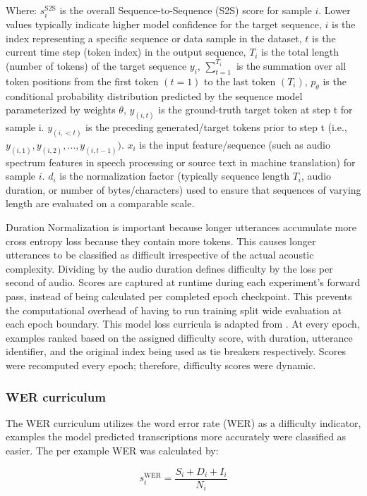 {Where:
 $s_i^ \text{S2S}$ is the overall Sequence-to-Sequence (S2S) score for sample $i$. Lower values typically indicate higher model confidence for the target sequence,
 $i$ is the index representing a specific sequence or data sample in the dataset,
$t$ is the current time step (token index) in the output sequence,
$T_i$ is the total length (number of tokens) of the target sequence $y_i$,
$\sum_{t=1}^{T_i}$ is the summation over all token positions from the first token $(t=1)$ to the last token $(T_i)$,
$p_\theta$ is the conditional probability distribution predicted by the sequence model parameterized by weights $θ$,
$y_(i,t)$ is the ground-truth target token at step t for sample i.
$y_(i,<t)$ is the preceding generated/target tokens prior to step t (i.e., $y_(i,1),y_(i,2),…,y_(i,t-1))$.
$x_i$ is the input feature/sequence (such as audio spectrum features in speech processing or source text in machine translation) for sample $i$.
$d_i$ is the normalization factor (typically sequence length $T_i$, audio duration, or number of bytes/characters) used to ensure that sequences of varying length are evaluated on a comparable scale.

Duration Normalization is important because longer utterances accumulate more cross entropy loss because they contain more tokens. This causes longer utterances to be classified as difficult irrespective of the actual acoustic complexity. Dividing by the audio duration defines difficulty by the loss per second of audio.
Scores are captured at runtime during each experiment’s forward pass, instead of being calculated per completed epoch checkpoint. This prevents the computational overhead of having to run training split wide evaluation at each epoch boundary. This model loss curricula is adapted from \citep{Karakasidis1382}. At every epoch, examples ranked based on the assigned difficulty score, with duration, utterance identifier, and the original index being used as tie breakers respectively. Scores were recomputed every epoch; therefore, difficulty scores were dynamic.

\subsubsection{WER curriculum}

The WER curriculum utilizes the word error rate (WER) as a difficulty indicator, examples the model predicted transcriptions more accurately were classified as easier. The per example WER was calculated by:

\begin{equation}
    s_i^{\text{WER}} = \frac{S_i + D_i + I_i}{N_i}
\end{equation}

}
